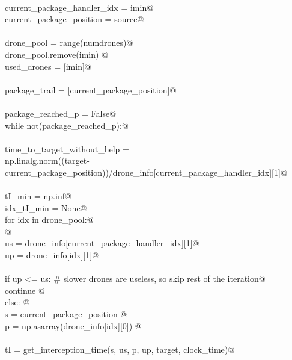 \documentclass[12.0pt]{report}
\begin{document}
\begin{flushleft}
\begin{list}{}{}
\mbox{}\verb@@\\
\mbox{}\verb@    current_package_handler_idx = imin@\\
\mbox{}\verb@    current_package_position    = source@\\
\mbox{}\verb@@\\
\mbox{}\verb@    drone_pool = range(numdrones)@\\
\mbox{}\verb@    drone_pool.remove(imin) @\\
\mbox{}\verb@    used_drones = [imin]@\\
\mbox{}\verb@@\\
\mbox{}\verb@    package_trail = [current_package_position]@\\
\mbox{}\verb@@\\
\mbox{}\verb@    package_reached_p   = False@\\
\mbox{}\verb@    while not(package_reached_p):@\\
\mbox{}\verb@@\\
\mbox{}\verb@          time_to_target_without_help =\@\\
\mbox{}\verb@              np.linalg.norm((target-current_package_position))/drone_info[current_package_handler_idx][1]@\\
\mbox{}\verb@@\\
\mbox{}\verb@          tI_min     = np.inf@\\
\mbox{}\verb@          idx_tI_min = None@\\
\mbox{}\verb@          for idx in drone_pool:@\\
\mbox{}\verb@              @\\
\mbox{}\verb@              us = drone_info[current_package_handler_idx][1]@\\
\mbox{}\verb@              up = drone_info[idx][1]@\\
\mbox{}\verb@@\\
\mbox{}\verb@              if up <= us: # slower drones are useless, so skip rest of the iteration@\\
\mbox{}\verb@                  continue @\\
\mbox{}\verb@              else: @\\
\mbox{}\verb@                s = current_package_position @\\
\mbox{}\verb@                p = np.asarray(drone_info[idx][0]) @\\
\mbox{}\verb@@\\
\mbox{}\verb@                tI = get_interception_time(s, us, p, up, target, clock_time)@\\

\end{list}
\end{flushleft}
\end{document}
